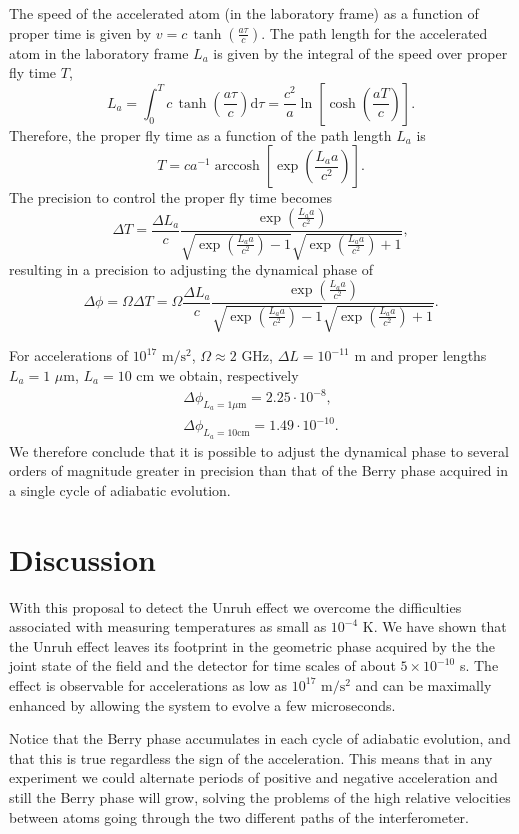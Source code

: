 The speed of the accelerated atom (in the laboratory frame) as a function of proper time is  given by
$v=c\,\tanh\left(\frac{a\tau}{c}\right)$. The path length for the accelerated atom in the laboratory frame $L_a$ is given by the integral of  the speed over proper fly time $T$,
\[L_a=\int_{0}^T c\,\tanh\left(\frac{a\tau}{c}\right) \text{d}\tau=\frac{c^2}{a}\ln\left[\cosh\left(\frac{aT}{c}\right)\right].\]
Therefore, the proper fly time as a function of the path length $L_a$ is
\[ T=c a^{-1}\operatorname{arccosh}\left[\exp\left(\frac{L_a a}{c^2}\right)\right].\]
The precision to control the proper fly time becomes  \[\Delta T=\frac{\Delta L_a}{c}\frac{\exp\left(\frac{L_aa}{c^2}\right)}{\sqrt{\exp\left(\frac{L_aa}{c^2}\right)-1}\sqrt{\exp\left(\frac{L_aa}{c^2}\right)+1}},\]
resulting in a precision to adjusting the dynamical phase of \[\Delta \phi=\Omega \Delta T=\Omega\frac{\Delta L_a}{c}\frac{\exp\left(\frac{L_aa}{c^2}\right)}{\sqrt{\exp\left(\frac{L_aa}{c^2}\right)-1}\sqrt{\exp\left(\frac{L_aa}{c^2}\right)+1}}.\]
\smallskip

For accelerations of $10^{17}$ $\text{m}/\text{s}^2$, $\Omega\approx 2$ GHz,  $\Delta L=10^{-11}$ m and proper lengths $L_a=1$ $\mu$m, $L_a=10$ cm we obtain, respectively\begin{eqnarray}
&\Delta \phi_{L_a=1\mu\text{m}}=2.25\cdot 10^{-8},&\\[3mm]
&\Delta \phi_{L_a=10\text{cm}}=1.49\cdot10^{-10}.&
\end{eqnarray}
We therefore conclude that it is possible to adjust the dynamical phase to several orders of magnitude greater in precision than
that of the Berry phase acquired in a single cycle of adiabatic evolution.

\section{Discussion}

With this proposal to detect the Unruh effect we overcome the difficulties associated with measuring temperatures as small as $10^{-4}$ K. We have shown that the Unruh effect leaves its footprint in the geometric phase acquired by the the joint state of the field and the detector for time scales of about $5\times10^{-10}$ s. The effect is observable for accelerations as low as $10^{17}$ $\text{m}/\text{s}^2$ and can be maximally enhanced by allowing the system to evolve a few microseconds. 

Notice that the Berry phase accumulates in each cycle of adiabatic evolution, and that this is true regardless the sign of the acceleration. This means that in any experiment we could alternate periods of positive and negative acceleration and still the Berry phase will grow, solving the problems of the high relative velocities between atoms going through the two different paths of the interferometer.

